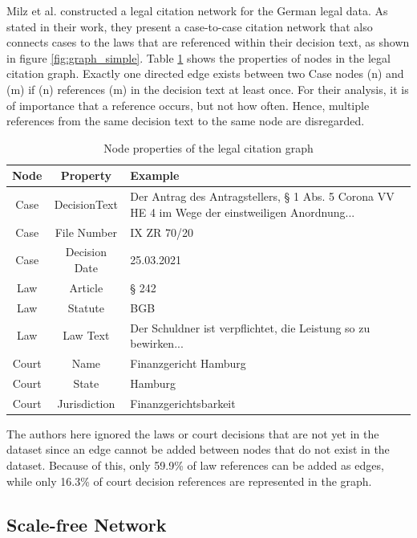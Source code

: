 \documentclass[runningheads]{llncs}
\begin{document}
Milz et al. \cite{milz2021analysis} constructed a legal citation network for the German legal data. As stated in their work, they present a case-to-case citation network that also connects cases to the laws that are referenced within their decision text, as shown in figure \ref{fig:graph_simple}. Table \ref{tab:properties} shows the properties of nodes in the legal citation graph. Exactly one directed edge exists between two Case nodes (n) and (m) if (n) references (m) in the decision text at least once. For their analysis, it is of importance that a reference occurs, but not how often. Hence, multiple references from the same decision text to the same node are disregarded.

\begin{table}[h]
\centering
\vspace{0.2cm}
\begin{tabular}{|c|c|p{3.5cm}|}

  \hline
   \textbf{Node}&\textbf{Property} &  \textbf{Example} \\
  \hline
Case & DecisionText & Der Antrag des Antragstellers, § 1 Abs. 5 Corona VV HE 4 im Wege der einstweiligen Anordnung...\\
  \hline
   Case&File Number & IX ZR 70/20\\
  \hline
   Case&Decision Date & 25.03.2021\\
  \hline\hline
  Law&Article & § 242\\
    \hline
  Law&Statute & BGB\\
  \hline
  Law&Law Text & Der Schuldner ist verpflichtet, die Leistung so zu bewirken...\\
  \hline\hline
  Court&Name & Finanzgericht Hamburg\\
  \hline
  Court&State & Hamburg\\
  \hline
  Court&Jurisdiction & Finanzgerichtsbarkeit\\
  \hline
\end{tabular}
\caption{Node properties of the legal citation graph\cite{milz2021analysis}}\label{tab:properties}
\end{table}

The authors here ignored the laws or court decisions that are not yet in the dataset since an edge cannot be added between nodes that do not exist in the dataset. Because of this, only 59.9\% of law references can be added as edges, while only 16.3\% of court decision references are represented in the graph.

\subsection{Scale-free Network}
\end{document}
